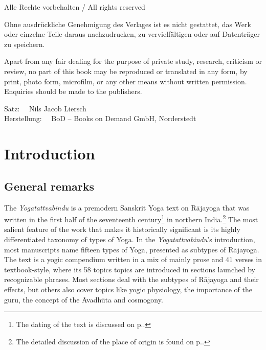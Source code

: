 \medskip

\noindent
Alle Rechte vorbehalten / All rights reserved

\medskip

\noindent
Ohne ausdrückliche Genehmigung des Verlages ist es nicht gestattet, das Werk oder einzelne Teile
daraus nachzudrucken, zu vervielfältigen oder auf Datenträger zu speichern.

\smallskip

\noindent
Apart from any fair dealing for the purpose of private study, research, criticism or review, no
part of this book may be reproduced or translated in any form, by print, photo form, microfilm, or
any other means without written permission. Enquiries should be made to the publishers.

\bigskip

\noindent
Satz: \ \ Nils Jacob Liersch \\
Herstellung: \ \ BoD – Books on Demand GmbH, Norderstedt  \\

\bigskip

\noindent

\normalsize

\newpage

\clearpage
\tableofcontents
\addtocounter{page}{-1}
\thispagestyle{empty}
\clearpage


\mainmatter

\chapter{Introduction}
\cleardoublepage

\section{General remarks}
The \textit{Yogatattvabindu} is a premodern Sanskrit Yoga text on Rājayoga that was written in the first half of the seventeenth century\footnote{The dating of the text is discussed on p.\pageref{dating}.} in northern India.\footnote{The detailed discussion of the place of origin is found on p.\pageref{placeoforigin}.} The most salient feature of the work that makes it historically significant is its highly differentiated taxonomy of types of Yoga. In the \textit{Yogatattvabindu}'s introduction, most manuscripts name fifteen types of Yoga, presented as subtypes of Rājayoga. The text is a yogic compendium written in a mix of mainly prose and 41 verses in textbook-style, where its 58 topics topics are introduced in sections launched by recognizable phrases. Most sections deal with the subtypes of Rājayoga and their effects, but others also cover topics like yogic physiology, the importance of the guru, the concept of the Āvadhūta and cosmogony.

